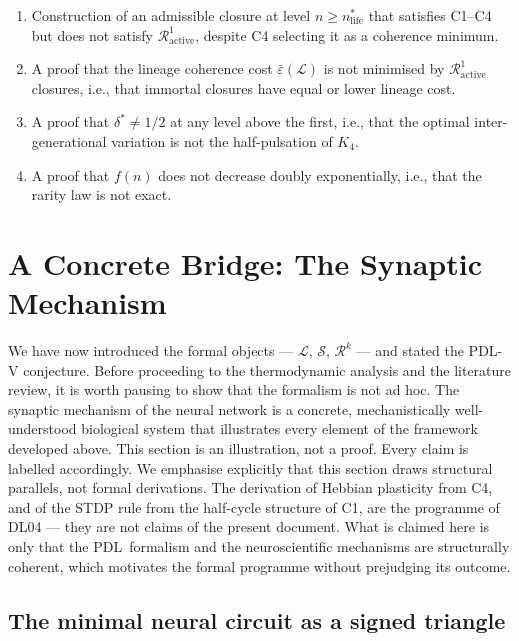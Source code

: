 \documentclass[12pt,a4paper]{article}
\theoremstyle{plain}
\theoremstyle{definition}
\theoremstyle{remark}
\newcommand{\PDL}{\textsc{PDL}}
\newcommand{\Kfour}{K_4}
\newcommand{\Sop}{\mathcal{S}}
\newcommand{\Rop}{\mathcal{R}}
\newcommand{\Lop}{\mathcal{L}}
\newcommand{\eps}{\varepsilon}
\begin{document}
\begin{enumerate}[leftmargin=2em]
\item Construction of an admissible closure at level $n \geq n^{*}_{\mathrm{life}}$
      that satisfies C1--C4 but does not satisfy $\Rop^1_{\mathrm{active}}$, despite
      C4 selecting it as a coherence minimum.
\item A proof that the lineage coherence cost $\bar{\eps}(\mathcal{L})$ is not
      minimised by $\Rop^1_{\mathrm{active}}$ closures, i.e., that immortal closures
      have equal or lower lineage cost.
\item A proof that $\delta^{*} \neq 1/2$ at any level above the first, i.e., that
      the optimal inter-generational variation is not the half-pulsation of $\Kfour$.
\item A proof that $f(n)$ does not decrease doubly exponentially, i.e., that the
      rarity law is not exact.
\end{enumerate}

\section{A Concrete Bridge: The Synaptic Mechanism}
\label{sec:synapse}

We have now introduced the formal objects --- $\Lop$, $\Sop$, $\Rop^k$ --- and stated
the \PDL-V conjecture. Before proceeding to the thermodynamic analysis and the
literature review, it is worth pausing to show that the formalism is not ad hoc. The
synaptic mechanism of the neural network is a concrete, mechanistically well-understood
biological system that illustrates every element of the framework developed above.
This section is an illustration, not a proof. Every claim is labelled accordingly.
We emphasise explicitly that this section draws structural parallels, not formal
derivations. The derivation of Hebbian plasticity from C4, and of the STDP rule from
the half-cycle structure of C1, are the programme of DL04 --- they are not claims
of the present document. What is claimed here is only that the \PDL\ formalism and
the neuroscientific mechanisms are structurally coherent, which motivates the formal
programme without prejudging its outcome.

\subsection{The minimal neural circuit as a signed triangle}
\end{document}
